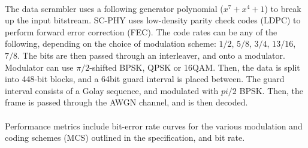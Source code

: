 \documentclass[justified,nobib]{tufte-handout}
\begin{document}
\begin{fullwidth}
\paragraph{} The data scrambler uses a following generator polynomial ($x^7+x^4+1$) to break up the input bitstream. SC-PHY uses low-density parity check codes (LDPC) to perform forward error correction (FEC). The code rates can be any of the following, depending on the choice of modulation scheme: $1/2$, $5/8$, $3/4$, $13/16$, $7/8$. The bits are then passed through an interleaver, and onto a modulator. Modulator can use $\pi/2$-shifted BPSK, QPSK or 16QAM. Then, the data is split into 448-bit blocks, and a 64bit guard interval is placed between. The guard interval consists of a Golay sequence, and modulated with $pi/2$ BPSK. Then, the frame is passed through the AWGN channel, and is then decoded. 
\paragraph{} Performance metrics include bit-error rate curves for the various modulation and coding schemes (MCS) outlined in the specification, and bit rate.




\end{fullwidth}
\end{document}

